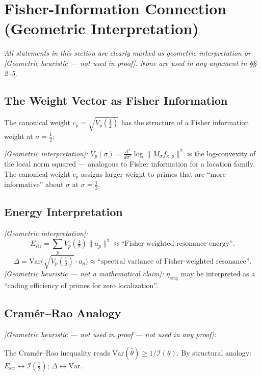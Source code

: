 \documentclass[11pt]{article}
\newcommand{\Estr}{E_{\mathrm{str}}}
\newcommand{\etaorig}{\eta_{\mathrm{orig}}}
\begin{document}
\section{Fisher-Information Connection (Geometric Interpretation)}

\emph{All statements in this section are clearly marked as geometric
interpretation or [Geometric heuristic --- not used in proof].
None are used in any argument in \S\S\,2--5.}

\subsection{The Weight Vector as Fisher Information}

The canonical weight $c_p = \sqrt{V_p(\tfrac{1}{2})}$ has the structure
of a Fisher information weight at $\sigma=\tfrac{1}{2}$:

\emph{[Geometric interpretation]:}
$V_p(\sigma) = \tfrac{d^2}{d\sigma^2}\log\|M_\sigma f_{\kappa,p}\|^2$
is the log-convexity of the local norm squared ---
analogous to Fisher information for a location family.
The canonical weight $c_p$ assigns larger weight to primes that are
``more informative'' about $\sigma$ at $\sigma=\tfrac{1}{2}$.

\subsection{Energy Interpretation}

\emph{[Geometric interpretation]:}
\[
\Estr = \sum_p V_p(\tfrac{1}{2})\|a_p\|^2
\approx \text{``Fisher-weighted resonance energy''}.
\]
\[
\Delta = \mathrm{Var}\bigl(\sqrt{V_p(\tfrac{1}{2})}\cdot a_p\bigr)
\approx \text{``spectral variance of Fisher-weighted resonance''}.
\]
\emph{[Geometric heuristic --- not a mathematical claim]:}
$\etaorig$ may be interpreted as a ``coding efficiency of primes
for zero localization''.

\subsection{Cram\'er--Rao Analogy}

\emph{[Geometric heuristic --- not used in proof --- not used in any proof]:}

The Cram\'er--Rao inequality reads
$\mathrm{Var}(\hat\theta)\geq 1/\mathcal{I}(\theta)$.
By structural analogy:
$\Estr\longleftrightarrow\mathcal{I}(\tfrac{1}{2})$;
$\Delta\longleftrightarrow\mathrm{Var}$.
\end{document}
